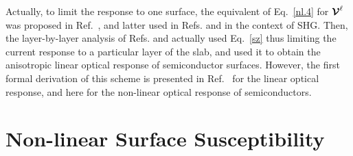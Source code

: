 \documentclass[floatfix,prb,aps,superscriptaddress,11pt,preprint]{revtex4}
\begin{document}
Actually, 
to limit the response to one surface, 
the equivalent of Eq.~\eqref{nl.4} for $\boldsymbol{\mathcal{\cal V}}^\ell$ was proposed 
in Ref.~, and latter used in Refs.
and  in the context of SHG. Then, 
the layer-by-layer analysis of Refs.  
and 
actually used Eq.~\eqref{sz}
thus limiting the current response
to a particular layer of the slab, and used it to obtain the
anisotropic linear optical response of semiconductor surfaces.
However, the first formal derivation of this scheme is presented in
Ref.~ for the linear optical response, and
here for the non-linear optical response of semiconductors.

\section{Non-linear Surface Susceptibility}\label{nonchi}
\end{document}

